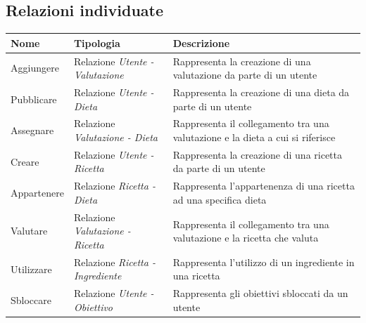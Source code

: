 ﻿\documentclass[a4paper,12pt]{report}
\begin{document}
\subsection{Relazioni individuate}
\begin{table}[h!]
    \centering
    \begin{tabular}{ |p{0.7in}|p{1.9in}|p{2.4in}| }
        \hline
        \scriptsize{\textbf{Nome}} & \scriptsize{\textbf{Tipologia}} & \scriptsize{\textbf{Descrizione}} \\
        \hline
        \scriptsize{Aggiungere} & \scriptsize{Relazione \newline \textit{Utente - Valutazione}} & \scriptsize{Rappresenta la creazione di una valutazione da parte di un utente} \\
        \hline
        \scriptsize{Pubblicare} & \scriptsize{Relazione \newline \textit{Utente - Dieta}} & \scriptsize{Rappresenta la creazione di una dieta da parte di un utente} \\
        \hline
        \scriptsize{Assegnare} & \scriptsize{Relazione \newline \textit{Valutazione - Dieta}} & \scriptsize{Rappresenta il collegamento tra una valutazione e la dieta a cui si riferisce} \\
        \hline
        \scriptsize{Creare} & \scriptsize{Relazione \newline \textit{Utente - Ricetta}} & \scriptsize{Rappresenta la creazione di una ricetta da parte di un utente} \\
        \hline
        \scriptsize{Appartenere} & \scriptsize{Relazione \newline \textit{Ricetta - Dieta}} & \scriptsize{Rappresenta l'appartenenza di una ricetta ad una specifica dieta} \\
        \hline
        \scriptsize{Valutare} & \scriptsize{Relazione \newline \textit{Valutazione - Ricetta}} & \scriptsize{Rappresenta il collegamento tra una valutazione e la ricetta che valuta} \\
        \hline
        \scriptsize{Utilizzare} & \scriptsize{Relazione \newline \textit{Ricetta - Ingrediente}} & \scriptsize{Rappresenta l'utilizzo di un ingrediente in una ricetta} \\
        \hline
        \scriptsize{Sbloccare} & \scriptsize{Relazione \newline \textit{Utente - Obiettivo}} & \scriptsize{Rappresenta gli obiettivi sbloccati da un utente} \\

\end{tabular}
\end{table}
\end{document}
